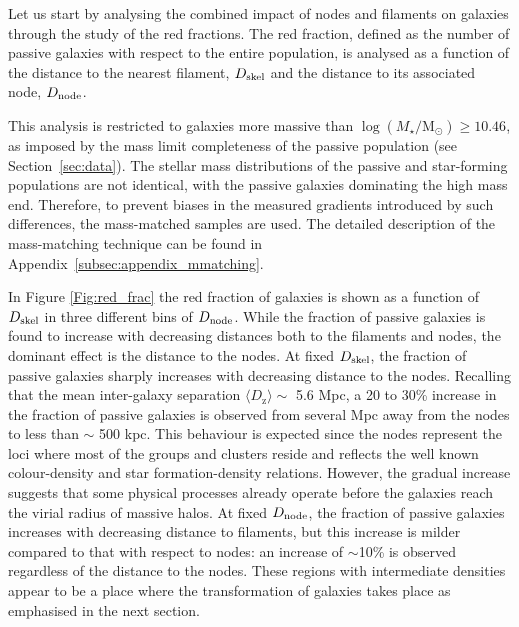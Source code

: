 \documentclass[useAMS,usenatbib]{mnras}
\newcommand{\Mstardot}{M\ensuremath{_{\star}} / \mathrm{M}\ensuremath{_{\odot}}}
\begin{document}
Let us start by analysing the combined impact of nodes and filaments on galaxies through the study of the red fractions.
The red fraction, defined as the number of passive galaxies with respect to the entire population, is analysed as a function of the distance to the nearest filament, $D_{\rm skel}$ and the distance to its associated node, $D_{\rm node}$.

This analysis is restricted to galaxies more massive than $\log(\Mstardot) \geq 10.46$, as imposed by the mass limit completeness of the passive population (see Section~\ref{sec:data}).  
The stellar mass distributions of the passive and star-forming populations are not identical, with the passive galaxies dominating the high mass end.  
Therefore, to prevent biases in the measured gradients introduced by such differences, the mass-matched samples are used. The detailed description of the mass-matching technique can be found in Appendix~\ref{subsec:appendix_mmatching}.

In Figure \ref{Fig:red_frac} the red fraction of galaxies is shown as a function of $D_{\rm skel}$ in three different bins of $D_{\rm node}$.  
While the fraction of passive galaxies is found to increase with decreasing distances both to the filaments and nodes, the dominant effect is  the distance to the nodes. 
At fixed $D_{\rm skel}$, the fraction of passive galaxies sharply increases with decreasing distance to the nodes. Recalling that the mean inter-galaxy separation $\langle D_{\mathrm{z}} \rangle \sim$ 5.6 Mpc, a 20 to 30\% increase in the fraction of passive galaxies is observed from several Mpc away from the nodes to less than $\sim$ 500 kpc. This behaviour is expected since the nodes represent the loci where most of the groups and clusters reside and reflects the well known colour-density \citep[e.g.][]{Blanton2003,Baldry2006,Bamford2009} and star formation-density \citep[e.g.][]{Lewis2002,Kauffmann2004} relations.
However, the gradual increase suggests that some physical processes already operate before the galaxies reach the virial radius of massive halos. 
At fixed $D_{\rm node}$, the fraction of passive galaxies increases with decreasing distance to filaments, but this increase is milder compared to that with respect to nodes:
an increase of $\sim$10\% is observed regardless of the distance to the nodes. 
These regions with intermediate densities appear to be a place where the transformation of galaxies takes place as emphasised in the next section. 
\end{document}
